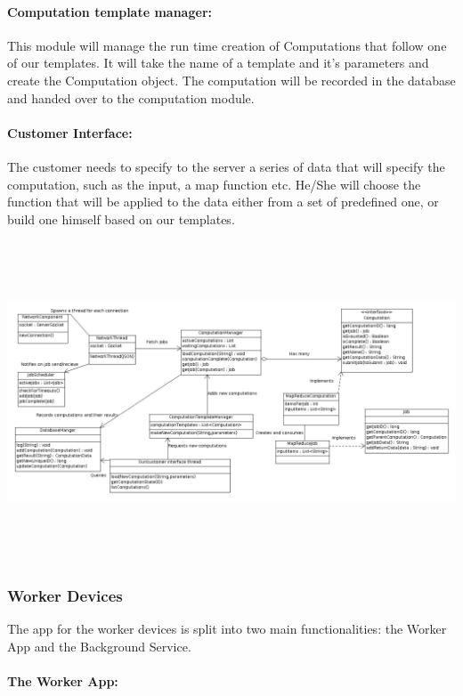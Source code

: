 \documentclass[a4paper,10pt]{article}
\begin{document}
\paragraph{Computation template manager:}

This module will manage the run time creation of Computations that follow one of our templates. It will take the name of a template and it's parameters and create the Computation object.
The computation will be recorded in the database and handed over to the computation module.

\paragraph{Customer Interface:}

The customer needs to specify to the server a series of data that will specify the computation, such as the input, a map function etc. He/She will choose the function that will be applied to the data either from a set of predefined one, or build one himself based on our templates.

\hspace{-110pt}\includegraphics[height=270pt]{serveruml.png}

\subsubsection{Worker Devices}
The app for the worker devices is split into two main functionalities: the Worker App and the Background Service. 

\paragraph{The Worker App:}
\end{document}
